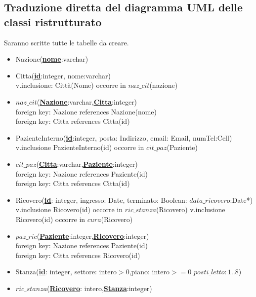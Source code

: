 \documentclass[12pt, letterpaper]{article}
\begin{document}
\subsection{Traduzione diretta del diagramma UML delle classi ristrutturato}
Saranno scritte tutte le tabelle da creare.
\begin{itemize}
    \item Nazione(\underline{\textbf{nome}}:varchar)
    \item Citta(\underline{\textbf{id}}:integer, nome:varchar)\\ v.inclusione: Città(Nome) occorre in $naz\_cit$(nazione)
    \item $naz\_cit$(\underline{\textbf{Nazione}}:varchar,\underline{\textbf{Citta}}:integer)\\
            foreign key: Nazione references Nazione(nome)\\
            foreign key: Citta references Citta(id)\\
    \item PazienteInterno(\underline{\textbf{id}}:integer, posta: Indirizzo, email: Email, numTel:Cell)\\
           v.inclusione PazienteInterno(id) occorre in $cit\_paz$(Paziente)
    \item $cit\_paz$(\underline{\textbf{Citta}}:varchar,\underline{\textbf{Paziente}}:integer)\\
            foreign key: Nazione references Paziente(id)\\
            foreign key: Citta references Citta(id)\\
    \item Ricovero(\underline{\textbf{id}}: integer, ingresso: Date, terminato: Boolean: $data\_ricovero$:Date*)\\
            v.inclusione Ricovero(id) occorre in $ric\_stanza$(Ricovero)
            v.inclusione Ricovero(id) occorre in $cura$(Ricovero)
    \item $paz\_ric$(\underline{\textbf{Paziente}}:integer,\underline{\textbf{Ricovero}}:integer)\\
    foreign key: Nazione references Paziente(id)\\
    foreign key: Citta references Ricovero(id)\\
    \item Stanza(\underline{\textbf{id}}: integer, settore: intero$>$0,piano: intero$>=$0 $posti\_letto: 1..8$)
    \item $ric\_stanza$(\underline{\textbf{Ricovero}}: intero,\underline{\textbf{Stanza}}:integer)\\

\end{itemize}
\end{document}
